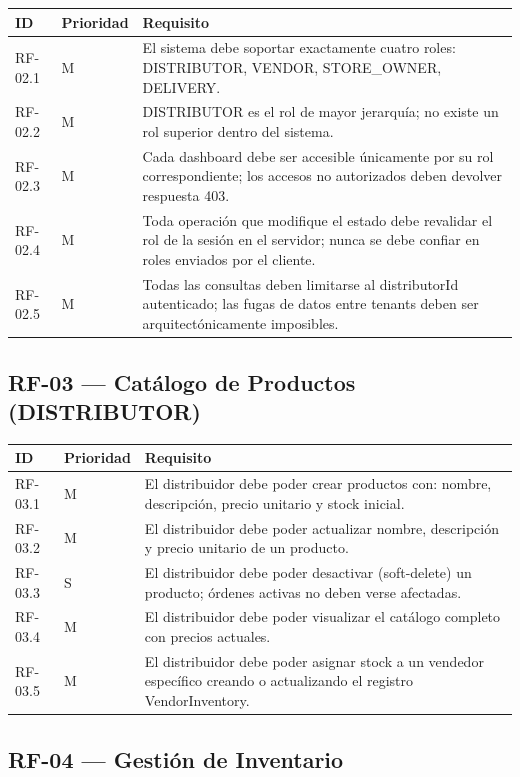 \documentclass[12pt,a4paper]{report}
\begin{document}
\begin{longtable}{|p{2cm}|p{2cm}|p{10cm}|}
\hline
\textbf{ID} & \textbf{Prioridad} & \textbf{Requisito} \\ \hline
RF-02.1 & M & El sistema debe soportar exactamente cuatro roles: DISTRIBUTOR, VENDOR, STORE\_OWNER, DELIVERY. \\ \hline
RF-02.2 & M & DISTRIBUTOR es el rol de mayor jerarquía; no existe un rol superior dentro del sistema. \\ \hline
RF-02.3 & M & Cada dashboard debe ser accesible únicamente por su rol correspondiente; los accesos no autorizados deben devolver respuesta 403. \\ \hline
RF-02.4 & M & Toda operación que modifique el estado debe revalidar el rol de la sesión en el servidor; nunca se debe confiar en roles enviados por el cliente. \\ \hline
RF-02.5 & M & Todas las consultas deben limitarse al distributorId autenticado; las fugas de datos entre tenants deben ser arquitectónicamente imposibles. \\ \hline
\end{longtable}

\subsection{RF-03 --- Catálogo de Productos (DISTRIBUTOR)}

\begin{longtable}{|p{2cm}|p{2cm}|p{10cm}|}
\hline
\textbf{ID} & \textbf{Prioridad} & \textbf{Requisito} \\ \hline
RF-03.1 & M & El distribuidor debe poder crear productos con: nombre, descripción, precio unitario y stock inicial. \\ \hline
RF-03.2 & M & El distribuidor debe poder actualizar nombre, descripción y precio unitario de un producto. \\ \hline
RF-03.3 & S & El distribuidor debe poder desactivar (soft-delete) un producto; órdenes activas no deben verse afectadas. \\ \hline
RF-03.4 & M & El distribuidor debe poder visualizar el catálogo completo con precios actuales. \\ \hline
RF-03.5 & M & El distribuidor debe poder asignar stock a un vendedor específico creando o actualizando el registro VendorInventory. \\ \hline
\end{longtable}

\subsection{RF-04 --- Gestión de Inventario}
\end{document}
